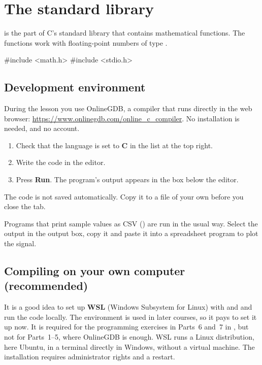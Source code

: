 
\section{The standard library }
\label{c18:sec:mathh}
 is the part of C's standard library that contains mathematical functions. The
functions work with floating-point numbers of type .

\begin{ccode}
#include <math.h>
#include <stdio.h>
\end{ccode}

\subsection{Development environment}
\label{c18:sec:miljo}
During the lesson you use OnlineGDB, a  compiler that runs directly in the web browser:
\url{https://www.onlinegdb.com/online_c_compiler}. No installation is needed, and no account.
\begin{enumerate}
  \item Check that the language is set to \textbf{C} in the list at the top right.
  \item Write the code in the editor.
  \item Press \textbf{Run}. The program's output appears in the box below the editor.
\end{enumerate}

\begin{aside}
\note[Note] The code is not saved automatically. Copy it to a file of your own before you close
the tab.
\end{aside}

Programs that print sample values as CSV () are run in the usual way. Select
the output in the output box, copy it and paste it into a spreadsheet program to plot the signal.

\subsection{Compiling on your own computer (recommended)}
\label{c18:sec:egendator}
It is a good idea to set up \textbf{WSL} (Windows Subsystem for Linux) with  and
 and run the code locally. The environment is used in later courses, so it pays to set
it up now. It is required for the programming exercises in Parts~6 and~7 in
, but not for Parts~1--5, where OnlineGDB is enough. WSL runs a
Linux distribution, here Ubuntu, in a terminal directly in Windows, without a virtual machine.
The installation requires administrator rights and a restart.

